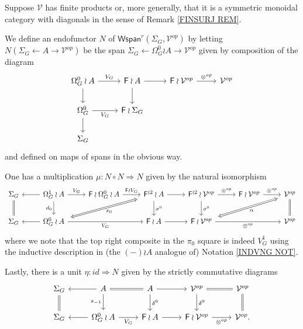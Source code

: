 \documentclass[a4paper,10pt]{article}%
\begin{document}
\begin{definition}
  \label{WSPAN_MONAD_DEFINITION}
	Suppose $\mathcal{V}$ has finite products or, more generally, that it is a symmetric monoidal category with diagonals in the sense of Remark \ref{FINSURJ REM}.
	
	We define an endofunctor $N$ of 
	$\mathsf{Wspan}^r(\Sigma_G,\mathcal{V}^{op})$
	by letting $N(\Sigma_G \leftarrow A \to \mathcal{V}^{op})$
	be the span $\Sigma_G \leftarrow \Omega_G^0 \wr A \to \mathcal{V}^{op}$ given by composition of the diagram
\[
	\begin{tikzcd}
	\Omega_G^0 \wr A \ar{r}{V_G} \ar{d}&
	\Fin \wr A \ar{r} \ar{d}&
	\Fin \wr \mathcal{V}^{op} \ar{r}{\otimes^{op}} &
	\mathcal{V}^{op}
\\
	\Omega_{G}^{0} \ar{r}[swap]{V_G} \ar{d} &
	\Fin \wr \Sigma_G
\\
	\Sigma_G
	\end{tikzcd}
\]
and defined on maps of spans in the obvious way.

One has a multiplication $\mu \colon N \circ N \Rightarrow N$ given by the natural isomorphism
\begin{equation}\label{MULTDEFSPAN EQ}
	\begin{tikzcd}
	\Sigma_G \ar[equal]{d}&
	\Omega_{G}^1 \wr A \ar{r}{V_G} \ar{d}[swap]{d_{0}} \ar{l}&
	\Fin \wr \Omega_{G}^0 \wr A \ar{r}{\Fin \wr V_G} &
	|[alias=FFOmega]| \Fin^{\wr 2} \wr A \ar{d}{\sigma^0} \ar{r} &
	\Fin^{\wr 2} \wr \mathcal{V}^{op} \ar{d}{\sigma^0} \ar{r}{\otimes^{op}} &
	\Fin \wr \mathcal{V}^{op} \ar{r}{\otimes^{op}} &
	|[alias=dog]|
	\mathcal{V}^{op} \ar[equal]{d}
\\
	\Sigma_G &
	|[alias=Omega]|\Omega_{G}^{0} \wr A \ar{rr}[swap]{V_G} \ar{l}&&
	\Fin \wr A \ar{r} &
	|[alias=cat]|
	\Fin \wr \mathcal{V}^{op} \ar{rr}[swap]{\otimes^{op}} &&
	\mathcal{V}^{op}
	\arrow[Leftrightarrow, from=FFOmega, to=Omega,shorten <=0.15cm,,shorten >=0.15cm,"\pi_0"]
	\arrow[Leftrightarrow, from=dog, to=cat,shorten <=0.15cm,,shorten >=0.15cm,"\alpha"]
	\end{tikzcd}
\end{equation}
where we note that the top right composite in the 
$\pi_0$ square is indeed $V_{G}^{1}$
using the inductive description in (the $(\minus) \wr A$ analogue of) Notation \ref{INDVNG NOT}.

Lastly, there is a unit $\eta \colon id \Rightarrow N$ given by the strictly commutative diagrams
\begin{equation}\label{UNITSPAN EQ}
	\begin{tikzcd}
	\Sigma_G \ar[equal]{d} &
	A \ar{l} \ar{d}[swap]{s_{-1}} \ar[equal]{r} &
	A \ar{d}{\delta^0} \ar{r} &
	\mathcal{V}^{op} \ar{d}{\delta^0} \ar[equal]{r}&
	\mathcal{V}^{op} \ar[equal]{d}
\\
	\Sigma_G &
	\Omega_{G}^{0} \wr A \ar{l} \ar{r}[swap]{V_G}&
	\Fin \wr A \ar{r} &
	\Fin \wr \mathcal{V}^{op} \ar{r}[swap]{\otimes^{op}} &
	\mathcal{V}^{op}.
	\end{tikzcd}
\end{equation}	
\end{definition}
\end{document}

